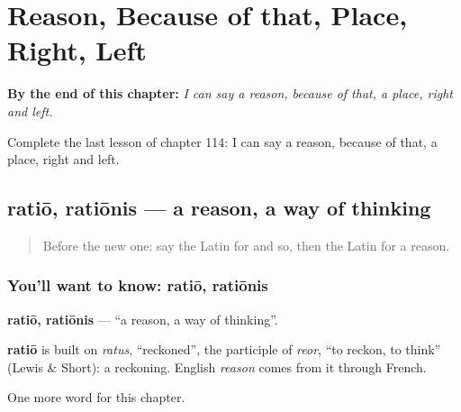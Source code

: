 
\chapter{Reason, Because of that, Place, Right, Left}
\label{ch:la-reason-because-of-that-place-right-left}

\begin{chapteropening}
\textbf{By the end of this chapter:} \emph{I can say a reason, because of that, a place, right and left.}

Complete the last lesson of chapter 114: I can say a reason, because of that, a place, right and left.
\end{chapteropening}

\section[ratiō, ratiōnis]{ratiō, ratiōnis — a reason, a way of thinking}

\label{lesson:LA-C114-ratio}



\begin{quote}
Before the new one: say the Latin for and so, then the Latin for a reason.
\end{quote}

\subsection*{You'll want to know: ratiō, ratiōnis}
\textbf{ratiō, ratiōnis} — \textquotedblleft{}a reason, a way of thinking\textquotedblright{}.

\begin{cousinweb}
\textbf{ratiō} is built on \emph{ratus}, \textquotedblleft{}reckoned\textquotedblright{}, the participle of \emph{reor}, \textquotedblleft{}to reckon, to think\textquotedblright{} (Lewis \& Short): a reckoning. English \emph{reason} comes from it through French.
\end{cousinweb}

\begin{grammarlens}[title={What you've built}]
One more word for this chapter.
\end{grammarlens}

